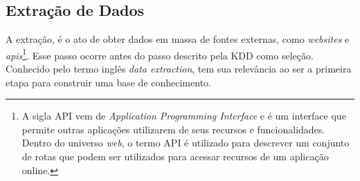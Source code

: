\subsection{Extração de Dados}
A extração, é o ato de obter dados em massa de fontes externas, como \textit{websites} e \textit{apis}\footnote{A sigla API vem de \textit{Application Programming Interface} e é um interface que permite outras aplicações utilizarem de seus recursos e funcionalidades. Dentro do universo \textit{web}, o termo API é utilizado para descrever um conjunto de rotas que podem ser utilizados para acessar recursos de um aplicação online.}. Esse passo ocorre antes do passo descrito pela KDD como seleção. Conhecido pelo termo inglês \textit{data extraction}, tem sua relevância ao ser a primeira etapa para construir uma base de conhecimento.

